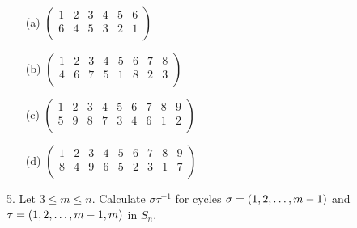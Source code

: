 \begin{mdframed}[style=darkAnswer,frametitle={Joe Starr}]
  \begin{itemize}
    \item [(a)] {
      $\begin{pmatrix}
        1 & 2 & 3 & 4 & 5 & 6\\
        6 & 4 & 5 & 3 & 2 & 1\\
      \end{pmatrix}$
    }
    \item [(b)] {
      $\begin{pmatrix}
        1 & 2 & 3 & 4 & 5 & 6 & 7 & 8\\
        4 & 6 & 7 & 5 & 1 & 8 & 2 & 3\\
      \end{pmatrix}$
    }
    \item [(c)] {
      $\begin{pmatrix}
        1 & 2 & 3 & 4 & 5 & 6 & 7 & 8 & 9\\
        5 & 9 & 8 & 7 & 3 & 4 & 6 & 1 & 2\\
      \end{pmatrix}$
    }
    \item [(d)] {
      $\begin{pmatrix}
        1 & 2 & 3 & 4 & 5 & 6 & 7 & 8 & 9 \\
        8 & 4 & 9 & 6 & 5 & 2 & 3 & 1 & 7\\
      \end{pmatrix}$
    }
  \end{itemize} 
\end{mdframed}
\newpage
\begin{mdframed}[style=darkQuesion]
  5. Let $3\leq m\leq n$. Calculate $\sigma\tau^{-1}$ for cycles 
  $\sigma= \left(1,2,\dots , m-1\right)$ and \\ $\tau= \left(1,2,\dots,m-1,m\right)$ in $S_n$.
\end{mdframed}
  
\begin{mdframed}[style=darkAnswer,frametitle={Joe Starr}]
\end{mdframed}
\newpage
